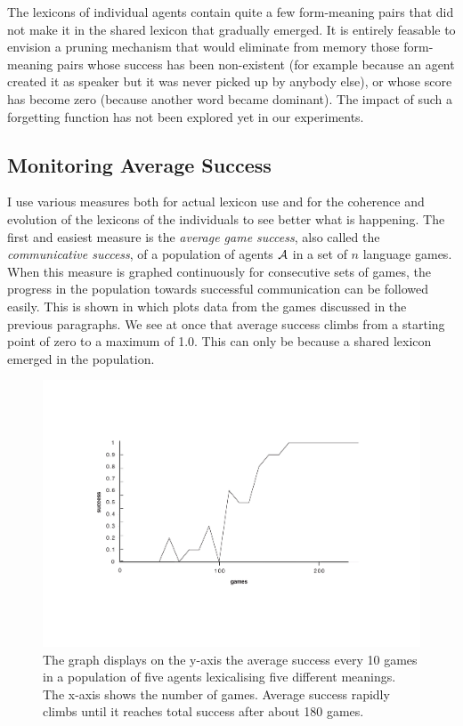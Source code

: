 The lexicons of individual agents contain quite a few form-meaning
pairs that did not make it in the shared lexicon that gradually 
emerged. It is entirely feasable to envision a pruning mechanism 
that would eliminate from memory those form-meaning pairs whose 
success has been non-existent (for example because an agent created
it as speaker but it was never picked up by anybody else), 
or whose score has become zero (because another word became
dominant). The impact of such a forgetting
function has not been explored yet in our experiments. 

\subsection{Monitoring Average Success} 

I use various measures both for actual lexicon use and for 
the coherence and evolution of the lexicons of
the individuals to see better what is happening. 
The first and easiest measure is the {\it average game success}, 
also called the {\it communicative success}, 
of a population of agents ${\cal A}$ in a set of $n$ language games. 
When this measure is graphed continuously for consecutive sets of 
games, the progress in the population
towards successful communication can be followed easily. This
is shown in  which plots data from the 
games discussed in the previous paragraphs. We see at once that
average success climbs from a starting point of zero
to a maximum of 1.0. This can only be because a shared lexicon 
emerged in the population. 
\begin{figure}[htbp]
  \centerline{\includegraphics[width=.70\textwidth]{chap5/figs/success}}
\caption{ \label{success} 
The graph displays on the y-axis the average success every 10 games
in a population of five agents lexicalising five
different meanings. The x-axis 
shows the number of games. Average success
rapidly climbs until it reaches total success after 
about 180 games.}
\end{figure}

